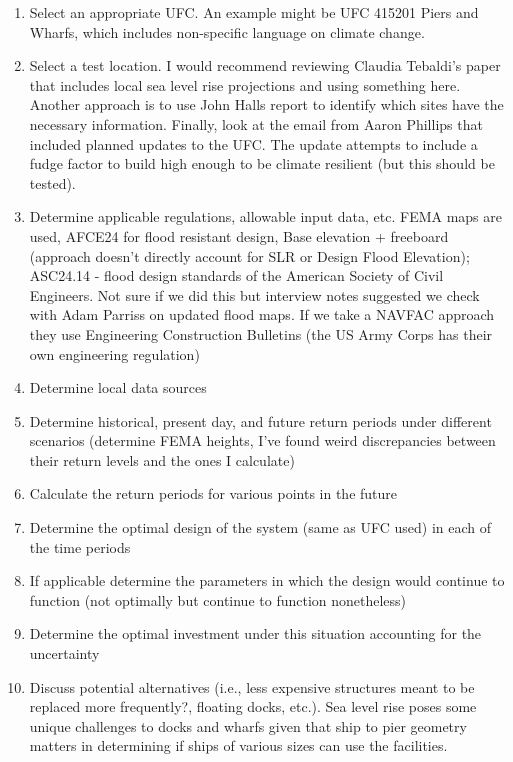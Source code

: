 \documentclass[10pt]{amsart}
\begin{document}
\begin{enumerate}[1.]
\item Select an appropriate UFC. An example might be UFC 415201 Piers and Wharfs, which includes non-specific language on climate change.
\item Select a test location. 
I would recommend reviewing Claudia Tebaldi's paper that includes local sea level rise projections and using something here. 
Another approach is to use John Halls report to identify which sites have the necessary information. 
Finally, look at the email from Aaron Phillips that included planned updates to the UFC. 
The update attempts to include a fudge factor to build high enough to be climate resilient (but this should be tested).  
\item Determine applicable regulations, allowable input data, etc.
FEMA maps are used, AFCE24 for flood resistant design, Base elevation + freeboard (approach doesn't directly account for SLR or Design Flood Elevation); ASC24.14 - flood design standards of the American Society of Civil Engineers.
Not sure if we did this but interview notes suggested we check with Adam Parriss on updated flood maps.
If we take a NAVFAC approach they use Engineering Construction Bulletins (the US Army Corps has their own engineering regulation)
\item Determine local data sources
\item Determine historical, present day, and future return periods under different scenarios (determine FEMA heights, I've found weird discrepancies between their return levels and the ones I calculate)
\item Calculate the return periods for various points in the future 
\item Determine the optimal design of the system (same as UFC used) in each of the time periods
\item If applicable determine the parameters in which the design would continue to function (not optimally but continue to function nonetheless)
\item Determine the optimal investment under this situation accounting for the uncertainty
\item Discuss potential alternatives (i.e., less expensive structures meant to be replaced more frequently?, floating docks, etc.).
Sea level rise poses some unique challenges to docks and wharfs given that ship to pier geometry matters in determining if ships of various sizes can use the facilities.
\end{enumerate}
\end{document}
